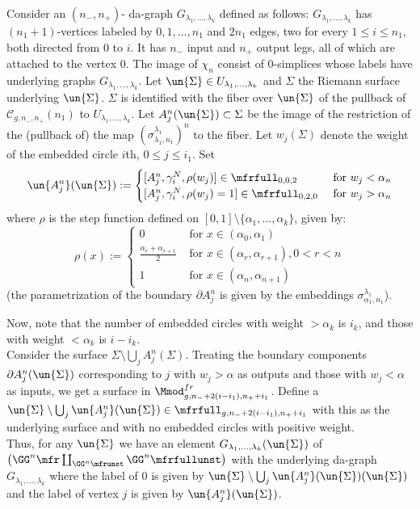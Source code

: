 \documentclass[a4paper,10pt]{amsart}
\begin{document}
Consider an $(n_-,n_+)$- da-graph $G_{\lambda_1,...,\lambda_k}$ defined as follows: $G_{\lambda_1,...,\lambda_k}$ has $(n_1+1)$-vertices labeled by $0,1,...,n_1$ and $2n_1$ edges, two for every $1\leq i \leq n_1$, both directed from $0$ to $i$. It has $n_-$ input and $n_+$ output legs, all of which are attached to the vertex $0$. The image of $\chi_n$ consist of $0$-simplices whose labels have underlying graphs $G_{\lambda_1,...,\lambda_k}	$. Let $\un{\Sigma} \in U_{\lambda_1,...,\lambda_k}$ and $\Sigma$ the Riemann surface underlying $\un{\Sigma}$. $\Sigma$ is identified with the fiber over $\un{\Sigma}$ of the pullback of $\mathcal{C}_{g,n_-,n_+}(n_1)$ to $U_{\lambda_1,...,\lambda_k}$. Let $A_j^n(\un{\Sigma}) \subset \Sigma$ be the image of the restriction of the (pullback of) the map $(\sigma_{\lambda_1,n_1}^{\lambda_1})^n$ to the fiber. Let $w_j(\Sigma)$ denote the weight of the embedded circle $i$th, $0 \leq j \leq i_1$. 
Set 
\[ \un{A^n_j}(\un{\Sigma}) :=
	\begin{cases}
		[A^n_j,\gamma_i^N,\rho(w_j)] \in \mfrfull_{0,0,2} &\mbox{ for } w_j < \alpha_n \\ 
		[A^n_j,\gamma_i^N,\rho(w_j)=1] \in \mfrfull_{0,2,0} &\mbox{ for } w_j > \alpha_n 
	\end{cases}
\]
where $\rho$ is the step function defined on $[0,1] \setminus \{\alpha_1,...,\alpha_k\}$, given by:
\begin{equation}\label{rhofunction} \rho(x) := \begin{cases}
				0 & \mbox{ for } x \in (\alpha_0,\alpha_1) \\
				\frac{\alpha_{r} + \alpha_{r+1}}{2} &\mbox{ for } x \in (\alpha_{r}, \alpha_{r+1}), 0<r<n \\ 
				1 & \mbox{ for } x \in (\alpha_n,\alpha_{n+1}) 
			\end{cases} 
\end{equation}
(the parametrization of the boundary $\partial A^n_j$ is given by the embeddings $\sigma^{\lambda_1}_{\alpha_1,n_1}$).

Now, note that the number of embedded circles with weight $> \alpha_k$ is $i_k$, and those with weight $< \alpha_k$ is $i-i_k$.\\
Consider the surface $\Sigma \setminus \bigcup_j A^n_j(\Sigma)$. Treating the boundary components $\partial A^n_j(\un{\Sigma})$ corresponding to $j$ with $w_j> \alpha$ as outputs and those with $w_j < \alpha$ as inputs, we get a surface in $\Mmod^{fr}_{g,n_-+2(i-i_1), n_+ + i_1}$. Define a \splitsurface \ $ \un{\Sigma} \setminus \bigcup_j \un{A^n_j}(\un{\Sigma}) \in \mfrfull_{g,n_-+2(i-i_1), n_+ + i_1}$ with this as the underlying surface and with no embedded circles with positive weight. \\
Thus, for any $\un{\Sigma}$ we have an element $G_{\lambda_1,...,\lambda_k}(\un{\Sigma})$ of $\big(\GG^{n}\mfr \coprod_{\GG^{n}\mfrunst} \GG^{n}\mfrfullunst \big)$ with the underlying da-graph $G_{\lambda_1,...,\lambda_k}$ where the label of $0$ is given by $\un{\Sigma} \setminus \bigcup_j \un{A^n_j}(\un{\Sigma}) (\un{\Sigma}) $ and the label of vertex $j$ is given by $\un{A^n_j}(\un{\Sigma})$.
\end{document}

